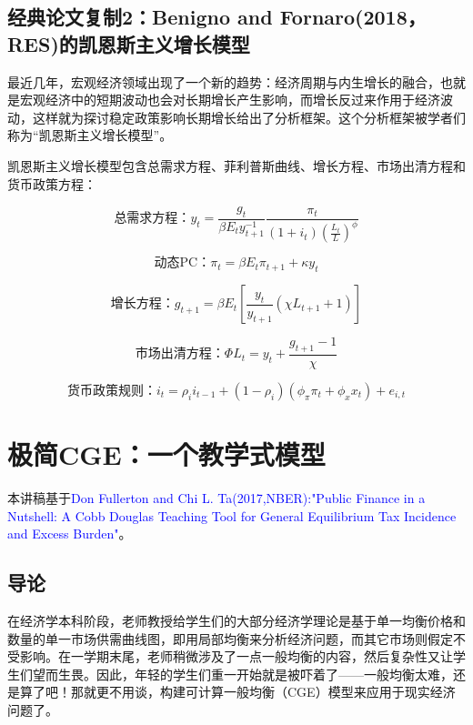 \documentclass[cn,12pt,math=newtx,citestyle=gb7714-2015,bibstyle=gb7714-2015]{elegantbook}
\begin{document}
	
	
	
	\section{经典论文复制2：Benigno and Fornaro(2018， RES)的凯恩斯主义增长模型}
	
	最近几年，宏观经济领域出现了一个新的趋势：经济周期与内生增长的融合，也就是宏观经济中的短期波动也会对长期增长产生影响，而增长反过来作用于经济波动，这样就为探讨稳定政策影响长期增长给出了分析框架。这个分析框架被学者们称为“凯恩斯主义增长模型”。
	
	凯恩斯主义增长模型包含总需求方程、菲利普斯曲线、增长方程、市场出清方程和货币政策方程：
	
		\begin{equation}
		\text{总需求方程：} y_t =\frac{g_t}{\beta E_t y_{t+1}^{-1}}\frac{\pi_t}{(1+i_t)\left(\frac{L_t}{L}\right)^\phi}
	\end{equation}

	\begin{equation}
	\text{动态PC：}\pi_t =\beta E_t \pi_{t+1} + \kappa y_t
\end{equation}

	\begin{equation}
	\text{增长方程：} g_{t+1} =\beta E_t \left[\frac{y_t}{y_{t+1}}(\chi L_{t+1}+1)\right]
\end{equation}

	\begin{equation}
	\text{市场出清方程：}\Phi L_t = y_t + \frac{g_{t+1}-1}{\chi}
\end{equation}
	
		\begin{equation}
		\text{货币政策规则：} i_t =\rho_i i_{t-1} + (1-\rho_i)(\phi_\pi \pi_{t} + \phi_x x_t) + e_{i,t}
	\end{equation}
	
	
	
	
	
	\chapter{极简CGE：一个教学式模型}
	
	
	
		本讲稿基于\textcolor{blue}{Don Fullerton and Chi L. Ta(2017,NBER):"Public Finance in a Nutshell: A Cobb Douglas Teaching Tool for General Equilibrium Tax Incidence and Excess Burden"}。
	
	
	
	
	\section{导论}
	在经济学本科阶段，老师教授给学生们的大部分经济学理论是基于单一均衡价格和数量的单一市场供需曲线图，即用局部均衡来分析经济问题，而其它市场则假定不受影响。在一学期末尾，老师稍微涉及了一点一般均衡的内容，然后复杂性又让学生们望而生畏。因此，年轻的学生们重一开始就是被吓着了——一般均衡太难，还是算了吧！那就更不用谈，构建可计算一般均衡（CGE）模型来应用于现实经济问题了。
	
\end{document}
